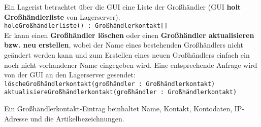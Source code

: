 Ein Lagerist betrachtet über die GUI eine Liste der Großhändler (GUI \textbf{holt Großhändlerliste} von Lagerserver).\\
\medskip
\texttt{holeGroßhändlerliste() : Großhändlerkontakt[]}\\
\medskip
Er kann einen \textbf{Großhändler löschen} oder einen \textbf{Großhändler aktualisieren bzw. neu erstellen}, wobei der Name eines bestehenden Großhändlers nicht geändert werden kann und zum Erstellen eines neuen Großhändlers einfach ein noch nicht vorhandener Name eingegeben wird.
Eine entsprechende Anfrage wird von der GUI an den Lagerserver gesendet:\\
\medskip
\texttt{löscheGroßhändlerkontakt(großhändler : Großhändlerkontakt)} \\
\medskip
\texttt{aktualisiereGroßhändlerkontakt(großhändler : Großhändlerkontakt)}\\
\medskip

Ein Großhändlerkontakt-Eintrag beinhaltet Name, Kontakt, Kontodaten, IP-Adresse und die Artikelbezeichnungen.